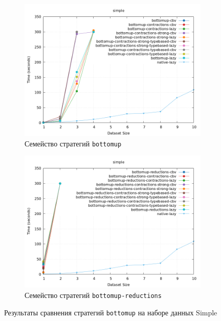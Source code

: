 \documentclass[../thesis.tex]{subfiles}
\begin{document}
\begin{figure}[h]
    \begin{subfigure}{0.5\textwidth}
    \includegraphics[width=\linewidth]{bottomup.png} 
    \caption{Семейство стратегий \texttt{bottomup}}
    \end{subfigure}
    \begin{subfigure}{0.5\textwidth}
    \includegraphics[width=\linewidth]{bottomup_reductions.png}
    \caption{Семейство стратегий \texttt{bottomup-reductions}}
    \end{subfigure}
    \caption{Результаты сравнения стратегий \texttt{bottomup} на наборе данных Simple}
    \label{plot_bottomup}
\end{figure}
\end{document}

